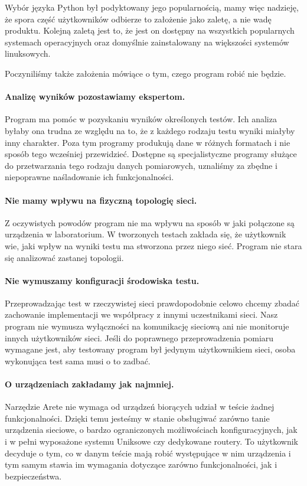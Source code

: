 \documentclass[00-praca-magisterska.tex]{subfiles}
\begin{document}
Wybór języka Python był podyktowany jego popularnością, mamy więc nadzieję, że
spora część użytkowników odbierze to założenie jako zaletę, a nie wadę
produktu. Kolejną zaletą jest to, że jest on dostępny na wszystkich popularnych
systemach operacyjnych oraz domyślnie zainstalowany na większości systemów
linuksowych.

Poczyniliśmy także założenia mówiące o tym, czego program robić nie będzie.

\paragraph{Analizę wyników pozostawiamy ekspertom.} Program ma pomóc w
pozyskaniu wyników określonych testów. Ich analiza byłaby ona trudna ze
względu na to, że z każdego rodzaju testu wyniki miałyby inny charakter. Poza
tym programy produkują dane w różnych formatach i nie sposób tego wcześniej
przewidzieć. Dostępne są specjalistyczne programy służące do przetwarzania tego
rodzaju danych pomiarowych, uznaliśmy za zbędne i niepoprawne naśladowanie ich
funkcjonalności.

\paragraph{Nie mamy wpływu na fizyczną topologię sieci.} Z oczywistych powodów
program nie ma wpływu na sposób w jaki połączone są urządzenia w laboratorium. W
tworzonych testach zakłada się, że użytkownik wie, jaki wpływ na wyniki testu ma
stworzona przez niego sieć. Program nie stara się analizować zastanej topologii.

\paragraph{Nie wymuszamy konfiguracji środowiska testu.} Przeprowadzając test w
rzeczywistej sieci prawdopodobnie celowo chcemy zbadać zachowanie implementacji
we współpracy z innymi uczestnikami sieci. Nasz program nie wymusza wyłączności
na komunikację sieciową ani nie monitoruje innych użytkowników sieci. Jeśli do
poprawnego przeprowadzenia pomiaru wymagane jest, aby testowany program był
jedynym użytkownikiem sieci, osoba wykonująca test sama musi o to zadbać.

\paragraph{O urządzeniach zakładamy jak najmniej.} Narzędzie Arete nie
wymaga od urządzeń biorących udział w teście żadnej funkcjonalności.
Dzięki temu jesteśmy w stanie obsługiwać zarówno tanie urządzenia sieciowe, o
bardzo ograniczonych możliwościach konfiguracyjnych, jak i w pełni wyposażone
systemu Uniksowe czy dedykowane routery. To użytkownik decyduje o tym, co w
danym teście mają robić występujące w nim urządzenia i tym samym stawia
im wymagania dotyczące zarówno funkcjonalności, jak i bezpieczeństwa.
\end{document}
